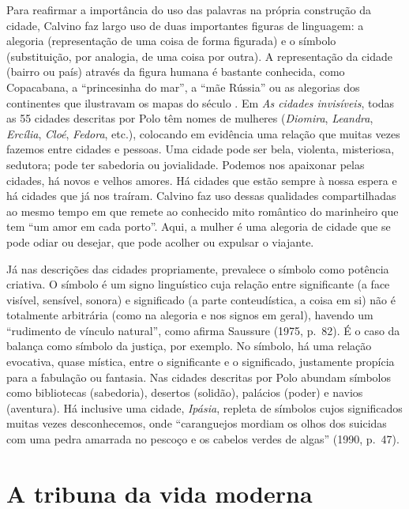 Para reafirmar a importância do uso das palavras na própria construção
da cidade, Calvino faz largo uso de duas importantes figuras de
linguagem: a alegoria (representação de uma coisa de forma figurada) e o
símbolo (substituição, por analogia, de uma coisa por outra). A
representação da cidade (bairro ou país) através da figura humana é
bastante conhecida, como Copacabana, a ``princesinha do mar'', a ``mãe
Rússia'' ou as alegorias dos continentes que ilustravam os mapas do
século . Em \emph{As cidades invisíveis}, todas as 55 cidades
descritas por Polo têm nomes de mulheres (\emph{Diomira},
\emph{Leandra}, \emph{Ercília}, \emph{Cloé}, \emph{Fedora}, etc.),
colocando em evidência uma relação que muitas vezes fazemos entre
cidades e pessoas. Uma cidade pode ser bela, violenta, misteriosa,
sedutora; pode ter sabedoria ou jovialidade. Podemos nos apaixonar pelas
cidades, há novos e velhos amores. Há cidades que estão sempre à nossa
espera e há cidades que já nos traíram. Calvino faz uso dessas
qualidades compartilhadas ao mesmo tempo em que remete ao conhecido mito
romântico do marinheiro que tem ``um amor em cada porto''. Aqui, a
mulher é uma alegoria de cidade que se pode odiar ou desejar, que pode
acolher ou expulsar o viajante.

Já nas descrições das cidades propriamente, prevalece o símbolo como
potência criativa. O símbolo é um signo linguístico cuja relação entre
significante (a face visível, sensível, sonora) e significado (a parte
conteudística, a coisa em si) não é totalmente arbitrária (como na
alegoria e nos signos em geral), havendo um ``rudimento de vínculo
natural'', como afirma Saussure (1975, p.~82). É o caso da balança como
símbolo da justiça, por exemplo. No símbolo, há uma relação evocativa,
quase mística, entre o significante e o significado, justamente propícia
para a fabulação ou fantasia. Nas cidades descritas por Polo abundam
símbolos como bibliotecas (sabedoria), desertos (solidão), palácios
(poder) e navios (aventura). Há inclusive uma cidade, \emph{Ipásia},
repleta de símbolos cujos significados muitas vezes desconhecemos, onde
``caranguejos mordiam os olhos dos suicidas com uma pedra amarrada no
pescoço e os cabelos verdes de algas'' (1990, p.~47).

\chapter{A tribuna da vida moderna}


